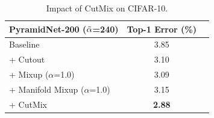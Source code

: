 \begin{table}[]
\centering
\begin{tabular}{@{}lcc@{}}
\toprule
PyramidNet-200 ($\Tilde{\alpha}$=240)  & Top-1 Error (\%) \\ 
\midrule
Baseline                                                                & 3.85  \\
+ Cutout                                                            & 3.10   \\
+ Mixup ($\alpha$=1.0)                                                 & 3.09  \\
+ Manifold Mixup ($\alpha$=1.0)                                     &  3.15 \\
+ CutMix                                                                & \textbf{2.88} \\  \toprule
\end{tabular}
\vspace{-0.1cm}
\caption{Impact of CutMix on CIFAR-10. 
}
\label{table:cifar-10}
\vspace{-0.3cm}
\end{table}